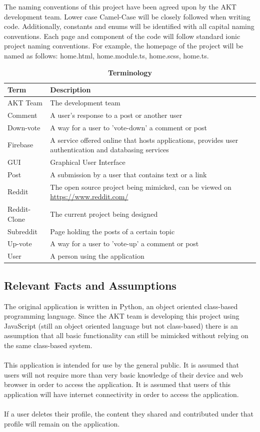 \documentclass[12pt,fleqn]{article}
\begin{document}
The naming conventions of this project have been agreed upon by the AKT development team.  Lower case Camel-Case will be closely followed when writing code.  Additionally, constants and enums will be identified with all capital naming conventions.  Each page and component of the code will follow standard ionic project naming conventions. For example, the homepage of the project will be named as follows: home.html, home.module.ts, home.scss, home.ts. 

\begin{table}[H]
\caption{\bf Terminology }
\begin{tabularx}{\textwidth}{p{3cm}X}
\toprule {\bf Term} & {\bf Description}\\
\midrule
AKT Team & The development team \\
Comment & A user's response to a post or another user \\
Down-vote & A way for a user to 'vote-down' a comment or post \\
Firebase & A service offered online that hosts applications, provides user authentication and databasing services \\
GUI & Graphical User Interface \\
Post & A submission by a user that contains text or a link \\
Reddit & The open source project being mimicked, can be viewed on \href{https://www.reddit.com/}{https://www.reddit.com/} \\
Reddit-Clone & The current project being designed \\
Subreddit & Page holding the posts of a certain topic \\
Up-vote & A way for a user to 'vote-up' a comment or post \\
User & A person using the application \\
\bottomrule
\end{tabularx}
\end{table}

\subsection {Relevant Facts and Assumptions}

The original application is written in Python, an object oriented class-based programming language.  Since the AKT team is developing this project using JavaScript (still an object oriented language but not class-based) there is an assumption that all basic functionality can still be mimicked without relying on the same class-based system. \\ \\
This application is intended for use by the general public.  It is assumed that users will not require more than very basic knowledge of their device and web browser in order to access the application.  It is assumed that users of this application will have internet connectivity in order to access the application.\\ \\ 
If a user deletes their profile, the content they shared and contributed under that profile will remain on the application.
\end{document}
